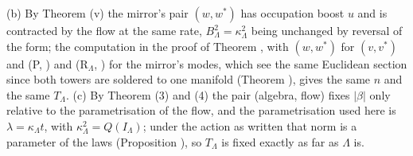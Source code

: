 (b) By Theorem (v) the mirror's pair $(w, w^{*})$ has occupation boost $u$ and is contracted by the flow at the same rate, $B_{\Lambda}^{2} = \kappa_{\Lambda}^{2}$ being unchanged by reversal of the form; the computation in the proof of Theorem , with $(w, w^{*})$ for $(v, v^{*})$ and (P, ) and (R$_{\Lambda}$, ) for the mirror's modes, which see the same Euclidean section since both towers are soldered to one manifold (Theorem ), gives the same $n$ and the same $T_{\Lambda}$. (c) By Theorem (3) and (4) the pair (algebra, flow) fixes $|\beta|$ only relative to the parametrisation of the flow, and the parametrisation used here is $\lambda = \kappa_{\Lambda}t$, with $\kappa_{\Lambda}^{2} = Q(I_{\Lambda})$; under the action as written that norm is a parameter of the laws (Proposition ), so $T_{\Lambda}$ is fixed exactly as far as $\Lambda$ is.
